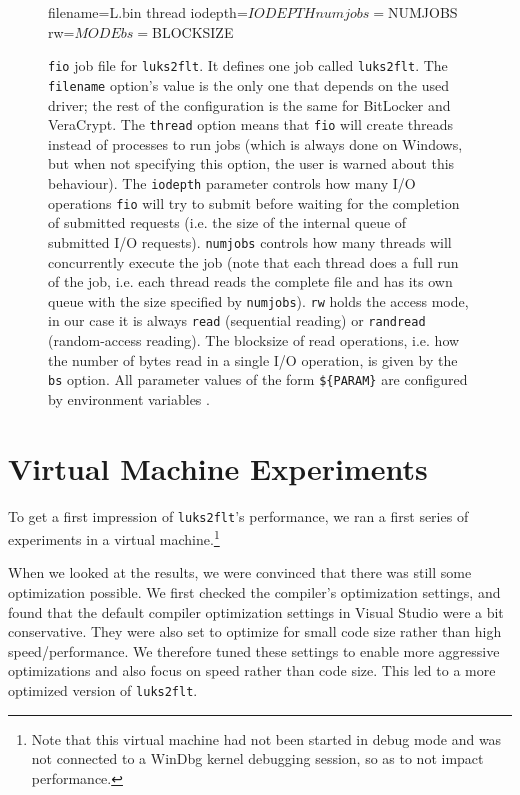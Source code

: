 \begin{figure}[htb!]
	\begin{inicode}
filename=L\:\random.bin
thread
iodepth=${IODEPTH}
numjobs=${NUMJOBS}
rw=${MODE}
bs=${BLOCKSIZE}
	\end{inicode}
	\caption[
		\texttt{fio} job file for \texttt{luks2flt}
	]{
		\texttt{fio} job file for \texttt{luks2flt}. It defines one job called \texttt{luks2flt}. The \texttt{filename} option's value is the only one that depends on the used driver; the rest of the configuration is the same for BitLocker and VeraCrypt. The \texttt{thread} option means that \texttt{fio} will create threads instead of processes to run jobs (which is always done on Windows, but when not specifying this option, the user is warned about this behaviour). The \texttt{iodepth} parameter controls how many I/O operations \texttt{fio} will try to submit before waiting for the completion of submitted requests (i.e. the size of the internal queue of submitted I/O requests). \texttt{numjobs} controls how many threads will concurrently execute the job (note that each thread does a full run of the job, i.e. each thread reads the complete file and has its own queue with the size specified by \texttt{numjobs}). \texttt{rw} holds the access mode, in our case it is always \texttt{read} (sequential reading) or \texttt{randread} (random-access reading). The blocksize of read operations, i.e. how the number of bytes read in a single I/O operation, is given by the \texttt{bs} option. All parameter values of the form \texttt{\$\{PARAM\}} are configured by environment variables \cite{Fio}.
	}
	\label{fig:performance.setup.fiojobfile}
\end{figure}


\section{Virtual Machine Experiments}
\label{chap:performance.vmexperiments}
To get a first impression of \texttt{luks2flt}'s performance, we ran a first series of experiments in a virtual machine.\footnote{\label{fn:performance.vmexperiments.vm} Note that this virtual machine had not been started in debug mode and was not connected to a WinDbg kernel debugging session, so as to not impact performance.}

When we looked at the results, we were convinced that there was still some optimization possible. We first checked the compiler's optimization settings, and found that the default compiler optimization settings in Visual Studio were a bit conservative. They were also set to optimize for small code size rather than high speed/performance. We therefore tuned these settings to enable more aggressive optimizations and also focus on speed rather than code size. This led to a more optimized version of \texttt{luks2flt}.

